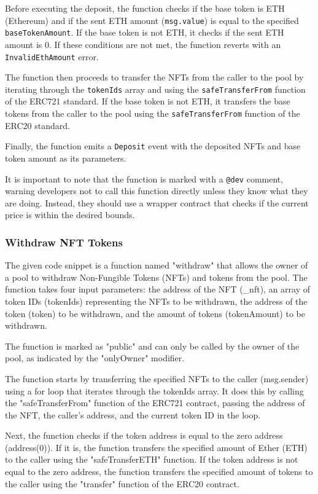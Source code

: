 Before executing the deposit, the function checks if the base token is
ETH (Ethereum) and if the sent ETH amount (\texttt{msg.value}) is equal
to the specified \texttt{baseTokenAmount}. If the base token is not ETH,
it checks if the sent ETH amount is 0. If these conditions are not met,
the function reverts with an \texttt{InvalidEthAmount} error.

The function then proceeds to transfer the NFTs from the caller to the
pool by iterating through the \texttt{tokenIds} array and using the
\texttt{safeTransferFrom} function of the ERC721 standard. If the base
token is not ETH, it transfers the base tokens from the caller to the
pool using the \texttt{safeTransferFrom} function of the ERC20 standard.

Finally, the function emits a \texttt{Deposit} event with the deposited
NFTs and base token amount as its parameters.

It is important to note that the function is marked with a \texttt{@dev}
comment, warning developers not to call this function directly unless
they know what they are doing. Instead, they should use a wrapper
contract that checks if the current price is within the desired bounds.

\hypertarget{withdraw-nft-tokens}{%
\subsubsection{Withdraw NFT Tokens}\label{withdraw-nft-tokens}}

The given code snippet is a function named "withdraw" that allows the
owner of a pool to withdraw Non-Fungible Tokens (NFTs) and tokens from
the pool. The function takes four input parameters: the address of the
NFT (\_nft), an array of token IDs (tokenIds) representing the NFTs to
be withdrawn, the address of the token (token) to be withdrawn, and the
amount of tokens (tokenAmount) to be withdrawn.

The function is marked as "public" and can only be called by the owner
of the pool, as indicated by the "onlyOwner" modifier.

The function starts by transferring the specified NFTs to the caller
(msg.sender) using a for loop that iterates through the tokenIds array.
It does this by calling the "safeTransferFrom" function of the ERC721
contract, passing the address of the NFT, the caller's address, and the
current token ID in the loop.

Next, the function checks if the token address is equal to the zero
address (address(0)). If it is, the function transfers the specified
amount of Ether (ETH) to the caller using the "safeTransferETH"
function. If the token address is not equal to the zero address, the
function transfers the specified amount of tokens to the caller using
the "transfer" function of the ERC20 contract.

